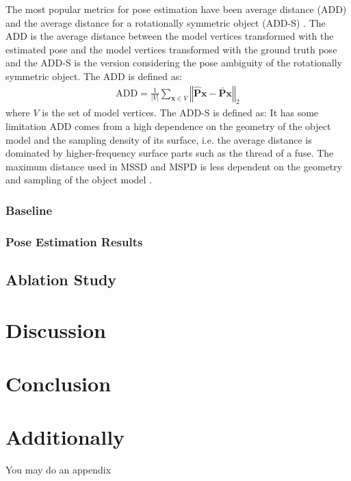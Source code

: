 \documentclass[12pt,DIV14,BCOR12mm,a4paper,footinclude=false,headinclude,parskip=half-,twoside,openright,cleardoublepage=empty,toc=index,bibliography=totoc,listof=totoc]{scrreprt}
\numberwithin{equation}{chapter}
\begin{document}
The most popular metrics for pose estimation have been average distance (ADD) and the average distance for a rotationally symmetric object (ADD-S) \cite{hinterstoisser2012model}. The ADD is the average distance between the model vertices transformed with the estimated pose and the model vertices transformed with the ground truth pose and the ADD-S is the version considering the pose ambiguity of the rotationally symmetric object. The ADD is defined as:
\begin{align}
  \text{ADD}=\frac{1}{\left|V\right|}\sum_{\mathbf{x}\in V}\left\Vert \hat{\mathbf{P}}\mathbf{x}-\bar{\mathbf{P}}\mathbf{x}\right\Vert _{2}
\end{align}
where $V$ is the set of model vertices. The ADD-S is defined as:
It has some limitation ADD comes from a high dependence on the geometry of the object model and the sampling density of its surface, i.e. the average distance is dominated by higher-frequency surface parts such as the thread of a fuse. The maximum distance used in MSSD and MSPD is less dependent on the geometry and sampling of the object model \cite{hodan2020bop}.

\subsection{Baseline}

\subsection{Pose Estimation Results}

\section{Ablation Study}

\chapter{Discussion}

\chapter{Conclusion}

\appendix
\chapter{Additionally}
You may do an appendix
\end{document}
